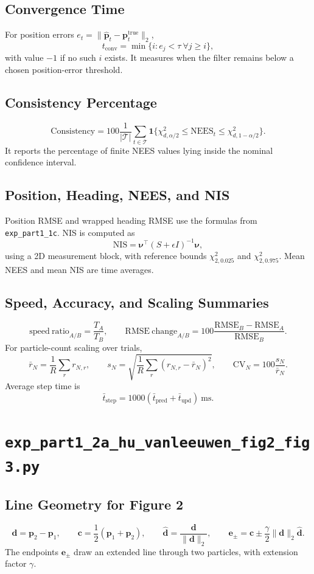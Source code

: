 \documentclass[11pt]{article}
\newcommand{\code}[1]{\texttt{#1}}
\newcommand{\RMSE}{\mathrm{RMSE}}
\newcommand{\NEES}{\mathrm{NEES}}
\newcommand{\NIS}{\mathrm{NIS}}
\newcommand{\ind}{\mathbf{1}}
\begin{document}
\subsection*{Convergence Time}
For position errors \(e_t=\|\hat{\bm p}_t-\bm p_t^{\mathrm{true}}\|_2\),
\[
t_{\mathrm{conv}}=\min\{i:e_j<\tau\ \forall j\ge i\},
\]
with value \(-1\) if no such \(i\) exists. It measures when the filter remains below a chosen position-error threshold.

\subsection*{Consistency Percentage}
\[
\mathrm{Consistency}=100\frac{1}{|\mathcal T|}
\sum_{t\in\mathcal T}\ind\{\chi^2_{d,\alpha/2}\le\NEES_t\le\chi^2_{d,1-\alpha/2}\}.
\]
It reports the percentage of finite NEES values lying inside the nominal confidence interval.

\subsection*{Position, Heading, NEES, and NIS}
Position RMSE and wrapped heading RMSE use the formulas from \code{exp\_part1\_1c}. NIS is computed as
\[
\NIS=\bm{\nu}^\top(S+\epsilon I)^{-1}\bm{\nu},
\]
using a 2D measurement block, with reference bounds \(\chi^2_{2,0.025}\) and \(\chi^2_{2,0.975}\). Mean NEES and mean NIS are time averages.

\subsection*{Speed, Accuracy, and Scaling Summaries}
\[
\mathrm{speed\ ratio}_{A/B}=\frac{T_A}{T_B},\qquad
\mathrm{RMSE\ change}_{A/B}=100\frac{\RMSE_B-\RMSE_A}{\RMSE_B}.
\]
For particle-count scaling over trials,
\[
\bar r_N=\frac{1}{R}\sum_r r_{N,r},\qquad
s_N=\sqrt{\frac{1}{R}\sum_r(r_{N,r}-\bar r_N)^2},\qquad
\mathrm{CV}_N=100\frac{s_N}{\bar r_N}.
\]
Average step time is
\[
\bar t_{\mathrm{step}}=1000(\bar t_{\mathrm{pred}}+\bar t_{\mathrm{upd}})\ \mathrm{ms}.
\]

\section{\code{exp\_part1\_2a\_hu\_vanleeuwen\_fig2\_fig3.py}}
\subsection*{Line Geometry for Figure 2}
\[
\bm d=\bm p_2-\bm p_1,\qquad
\bm c=\frac12(\bm p_1+\bm p_2),\qquad
\hat{\bm d}=\frac{\bm d}{\|\bm d\|_2},\qquad
\bm e_{\pm}=\bm c\pm\frac{\gamma}{2}\|\bm d\|_2\hat{\bm d}.
\]
The endpoints \(\bm e_\pm\) draw an extended line through two particles, with extension factor \(\gamma\).
\end{document}
